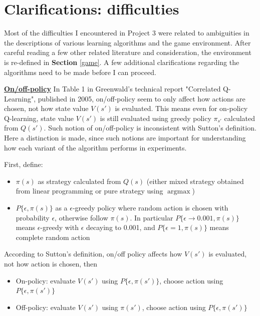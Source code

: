 \documentclass[10pt]{article}
\DeclareMathOperator*{\argmax}{argmax} %
\begin{document}
\section{Clarifications: difficulties} \label{clarification}
Most of the difficulties I encountered in Project 3 were related to ambiguities in the descriptions of various learning algorithms and the game environment. After careful reading a few other related literature and consideration, the environment is re-defined in \textbf{Section} \ref{game}. A few additional clarifications regarding the algorithms need to be made before I can proceed.\par
\bigbreak
\noindent
\ul{\textbf{On/off-policy}} In Table 1 in Greenwald's technical report "Correlated Q-Learning", published in 2005\cite{GreenwaldCorrelatedQLearning2005}, on/off-policy seem to only affect how actions are chosen, not how state value $V(s')$ is evaluated. This means even for on-policy Q-learning, state value $V(s')$ is still evaluated using greedy policy $\pi_{s'}$ calculated from $Q(s')$. Such notion of on/off-policy is inconsistent with Sutton's definition\cite{SuttonReinforcementLearningIntroduction1998}. Here a distinction is made, since such notions are important for understanding how each variant of the algorithm performs in experiments.\par
\bigbreak
\noindent
First, define:
\begin{itemize}
   \item $\pi(s)$ as strategy calculated from $Q(s)$ (either mixed strategy obtained from linear programming or pure strategy using $\argmax$)
   \item $P\{\epsilon, \pi(s)\}$ as a $\epsilon$-greedy policy where random action is chosen with probability $\epsilon$, otherwise follow $\pi(s)$. In particular $P\{\epsilon\rightarrow 0.001, \pi(s)\}$ means $\epsilon$-greedy with $\epsilon$ decaying to 0.001, and $P\{\epsilon=1, \pi(s)\}$ means complete random action
\end{itemize}

 
\noindent
According to Sutton's definition\cite{SuttonReinforcementLearningIntroduction1998},  on/off policy affects how $V(s')$ is evaluated, not how action is chosen, then
\begin{itemize}
   \item On-policy: evaluate $V(s')$ using $P\{\epsilon, \pi(s')\}$, choose action using $P\{\epsilon, \pi(s')\}$
  \item Off-policy: evaluate $V(s')$ using $\pi(s')$, choose action using $P\{\epsilon, \pi(s')\}$
\end{itemize}
\end{document}
